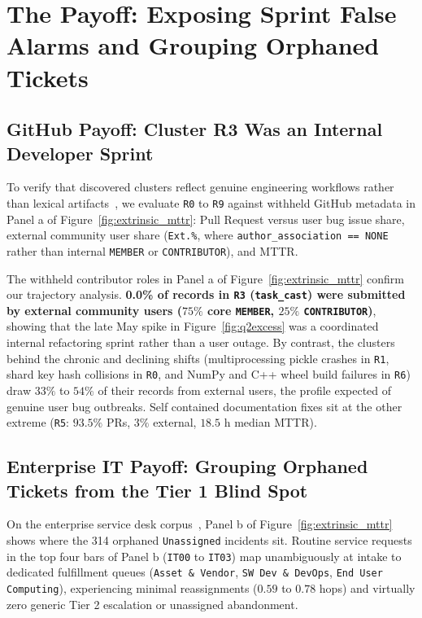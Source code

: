 \documentclass[sigconf,nonacm,pbalance]{acmart}
\begin{document}
\section{The Payoff: Exposing Sprint False Alarms and Grouping Orphaned Tickets}

\subsection{GitHub Payoff: Cluster R3 Was an Internal Developer Sprint}
To verify that discovered clusters reflect genuine engineering workflows rather than lexical artifacts~\cite{hoyle2021automated, chen2020incidental}, we evaluate \texttt{R0} to \texttt{R9} against withheld GitHub metadata in Panel a of Figure~\ref{fig:extrinsic_mttr}: Pull Request versus user bug issue share, external community user share (\texttt{Ext.\%}, where \texttt{author\_association == NONE} rather than internal \texttt{MEMBER} or \texttt{CONTRIBUTOR}), and MTTR.

The withheld contributor roles in Panel a of Figure~\ref{fig:extrinsic_mttr} confirm our trajectory analysis. \textbf{0.0\% of records in \texttt{R3} (\texttt{task\_cast}) were submitted by external community users ($75\%$ core \texttt{MEMBER}, $25\%$ \texttt{CONTRIBUTOR})}, showing that the late May spike in Figure~\ref{fig:q2excess} was a coordinated internal refactoring sprint rather than a user outage. By contrast, the clusters behind the chronic and declining shifts (multiprocessing pickle crashes in \texttt{R1}, shard key hash collisions in \texttt{R0}, and NumPy and C++ wheel build failures in \texttt{R6}) draw $33\%$ to $54\%$ of their records from external users, the profile expected of genuine user bug outbreaks. Self contained documentation fixes sit at the other extreme (\texttt{R5}: $93.5\%$ PRs, $3\%$ external, $18.5$ h median MTTR).

\subsection{Enterprise IT Payoff: Grouping Orphaned Tickets from the Tier 1 Blind Spot}
\label{sec:ittriage}
On the enterprise service desk corpus~\cite{agarwal2012identifying, vogel2024itsm}, Panel b of Figure~\ref{fig:extrinsic_mttr} shows where the 314 orphaned \texttt{Unassigned} incidents sit. Routine service requests in the top four bars of Panel b (\texttt{IT00} to \texttt{IT03}) map unambiguously at intake to dedicated fulfillment queues (\texttt{Asset \& Vendor}, \texttt{SW Dev \& DevOps}, \texttt{End User Computing}), experiencing minimal reassignments ($0.59$ to $0.78$ hops) and virtually zero generic Tier 2 escalation or unassigned abandonment.
\end{document}
